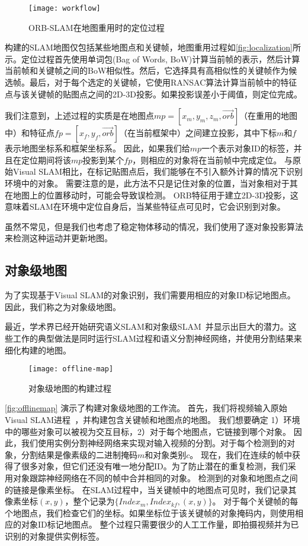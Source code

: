\begin{figure}[htb]
  \centering
  \texttt{[image: workflow]}
  \caption{ORB-SLAM\cite{mur2017orb}在地图重用时的定位过程}
  \label{fig:localization}
\end{figure}

构建的SLAM地图\cite{mur2017orb}仅包括某些地图点和关键帧，地图重用过程如\autoref{fig:localization}所示。定位过程首先使用单词包(Bag of Words, BoW)\cite{galvez2012bags}计算当前帧的表示，然后计算当前帧和关键帧之间的BoW相似性。然后，它选择具有高相似性的关键帧作为候选帧。最后，对于每个选定的关键帧，它使用RANSAC\cite{derpanis2010overview}算法计算当前帧中的特征点与该关键帧的贴图点之间的2D-3D投影。如果投影误差小于阈值，则定位完成。

我们注意到，上述过程的实质是在地图点$mp = [x_m,y_m,z_m,\vec{orb}]$（在重用的地图中）和特征点$fp = [x_f,y_f,\vec{orb}]$（在当前框架中）之间建立投影，其中下标$m$和$f$表示地图坐标系和框架坐标系。
因此，如果我们给$mp$一个表示对象ID的标签，并且在定位期间将该$mp$投影到某个$fp$，则相应的对象将在当前帧中完成定位。
与原始Visual SLAM相比，在标记贴图点后，我们能够在不引入额外计算的情况下识别环境中的对象。
需要注意的是，此方法不只是记住对象的位置，当对象相对于其在地图上的位置移动时，可能会导致误检测。
ORB特征用于建立2D-3D投影，这意味着SLAM在环境中定位自身后，当某些特征点可见时，它会识别到对象。

虽然不常见，但是我们也考虑了稳定物体移动的情况，我们使用了逐对象投影算法来检测这种运动并更新地图。


\subsection{对象级地图}
\label{sec:map}
为了实现基于Visual SLAM的对象识别，我们需要用相应的对象ID标记地图点。因此，我们称之为对象级地图。

最近，学术界已经开始研究语义SLAM\cite{bowman2017probabilistic,kaneko2018mask}和对象级SLAM~\cite{mccormac2018fusion++,strecke2019fusion}并显示出巨大的潜力。这些工作的典型做法是同时运行SLAM过程和语义分割神经网络，并使用分割结果来细化构建的地图。

\begin{figure}[htb]
	\centering
	\texttt{[image: offline-map]}
	\caption{对象级地图的构建过程}
	\label{fig:offlinemap}
\end{figure}

\autoref{fig:offlinemap} 演示了构建对象级地图的工作流。
首先，我们将视频输入原始Visual SLAM进程~\cite{mur2017orb}，并构建包含关键帧和地图点的地图。
我们想要确定 1）环境中的哪些对象可以被视为交互目标，2）对于每个地图点，它链接到哪个对象。
因此，我们使用实例分割神经网络\cite{He_2017_ICCV}来实现对输入视频的分割。对于每个检测到的对象，分割结果是像素级的二进制掩码$m$和对象类别$c$。
现在，我们在连续的帧中获得了很多对象，但它们还没有唯一地分配ID。为了防止潜在的重复检测，我们采用对象跟踪神经网络在不同的帧中合并相同的对象。
检测到的对象和地图点之间的链接是像素坐标。
在SLAM过程中，当关键帧中的地图点可见时，我们记录其像素坐标$(x,y)$，整个记录为$\{Index_m,Index_{kf}, (x,y)\}$。
对于每个关键帧的每个地图点，我们检查它们的坐标。如果坐标位于该关键帧的对象掩码内，则使用相应的对象ID标记地图点。
整个过程只需要很少的人工工作量，即拍摄视频并为已识别的对象提供实例标签。

